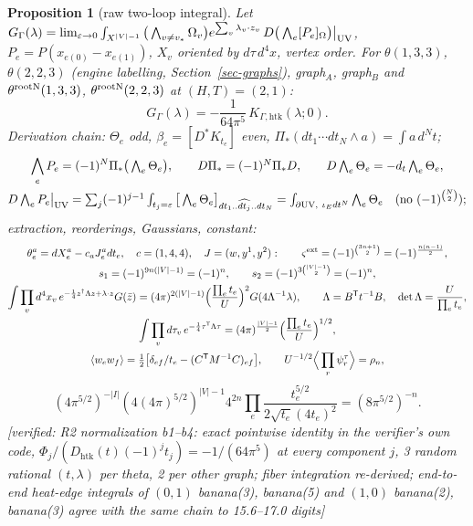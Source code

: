 \documentclass[10pt,a4paper]{article}
\numberwithin{equation}{section}
\newtheorem{proposition}[theorem]{Proposition}
\theoremstyle{definition}
\theoremstyle{remark}
\newcommand{\zb}{\bar z}
\newcommand{\ver}[1]{\textup{[verified: #1]}}
\newcommand{\htk}{\mathrm{htk}}
\begin{document}
\begin{proposition}[raw two-loop integral]\label{prop-raw}
Let $G_\Gamma(\lambda)=\lim_{\varepsilon\to0}\int_{X^{|V|-1}}\big(\bigwedge_{v\neq v_*}\Omega_v\big)e^{\sum_v\lambda_v\cdot z_v}\,D\big(\bigwedge_e[P_e]_\Omega\big)\big|_{\rm UV}$, $P_e=P(x_{e(0)}-x_{e(1)})$, $X_v$ oriented by $d\tau\,d^4x$, vertex order. For $\theta(1,3,3)$, $\theta(2,2,3)$ (engine labelling, Section~\ref{sec-graphs}), graph$_A$, graph$_B$ and $\theta^{\rm rootN}(1,3,3)$, $\theta^{\rm rootN}(2,2,3)$ at $(H,T)=(2,1)$:
\begin{equation}
G_\Gamma(\lambda)=-\frac{1}{64\pi^5}\,K_{\Gamma,\htk}(\lambda;0).
\end{equation}
Derivation chain: $\Theta_e$ odd, $\beta_e=[D^*K_{t_e}]$ even, $\Pi_*(dt_1\cdots dt_N\wedge a)=\int a\,d^Nt$;
\begin{gather}
\bigwedge_eP_e=(-1)^N\Pi_*\big(\textstyle\bigwedge_e\Theta_e\big),\qquad D\Pi_*=(-1)^N\Pi_*D,\qquad D\textstyle\bigwedge_e\Theta_e=-d_t\bigwedge_e\Theta_e,\\
D\textstyle\bigwedge_eP_e\big|_{\rm UV}=\sum_j(-1)^{j-1}\int_{t_j=\varepsilon}\big[\bigwedge_e\Theta_e\big]_{dt_1..\widehat{dt_j}..dt_N}=\int_{\partial{\rm UV},\ \iota_Edt^N}\bigwedge_e\Theta_e\quad(\text{no }(-1)^{\binom N2});
\end{gather}
extraction, reorderings, Gaussians, constant:
\begin{gather}
\theta^a_e=dX^a_e-c_aJ^a_edt_e,\quad c=(1,4,4),\quad J=(w,y^1,y^2):\qquad \varsigma^{\rm ext}=(-1)^{\binom{3n+1}2}=(-1)^{\frac{n(n-1)}2},\\
s_1=(-1)^{9n(|V|-1)}=(-1)^n,\qquad s_2=(-1)^{3\binom{|V|-1}2}=(-1)^n,\\
\int\prod_vd^4x_v\,e^{-\frac14z^\dagger\Lambda z+\lambda\cdot z}G(\zb)=(4\pi)^{2(|V|-1)}\Big(\frac{\prod_et_e}U\Big)^2G(4\Lambda^{-1}\lambda),\qquad \Lambda=B^{\mathsf T}t^{-1}B,\quad \det\Lambda=\frac{U}{\prod_et_e},\\
\int\prod_vd\tau_v\,e^{-\frac14\tau^{\mathsf T}\Lambda\tau}=(4\pi)^{\frac{|V|-1}2}\Big(\frac{\prod_et_e}U\Big)^{1/2},\\ \langle w_ew_f\rangle=\tfrac12\big[\delta_{ef}/t_e-(C^{\mathsf T}M^{-1}C)_{ef}\big],\qquad U^{-1/2}\Big\langle\prod_r\psi^\tau_r\Big\rangle=\rho_n,
\end{gather}
\begin{equation}
(4\pi^{5/2})^{-|I|}(4(4\pi)^{5/2})^{|V|-1}4^{2n}\prod_e\frac{t_e^{5/2}}{2\sqrt{t_e}(4t_e)^2}=(8\pi^{5/2})^{-n} .
\end{equation}
\ver{R2 normalization b1--b4: exact pointwise identity in the verifier's own code, $\Phi_j/(D_\htk(t)(-1)^jt_j)=-1/(64\pi^5)$ at every component $j$, 3 random rational $(t,\lambda)$ per theta, 2 per other graph; fiber integration re-derived; end-to-end heat-edge integrals of $(0,1)$ banana(3), banana(5) and $(1,0)$ banana(2), banana(3) agree with the same chain to 15.6--17.0 digits}
\end{proposition}
\end{document}
